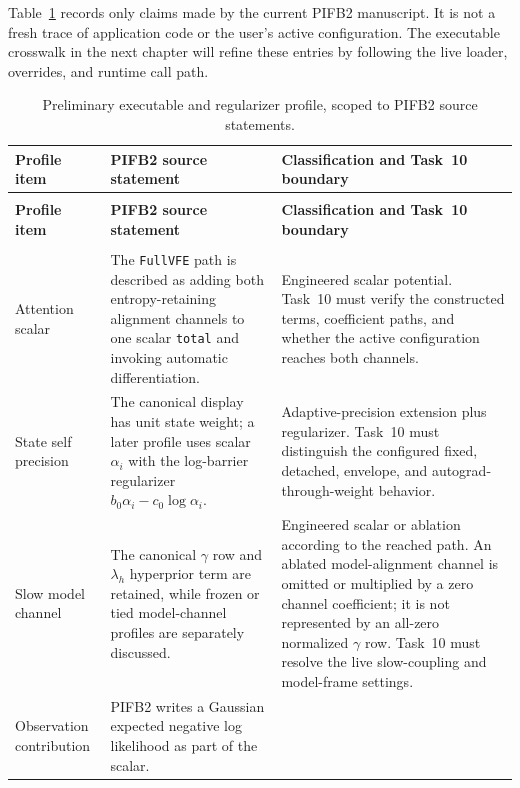 Table~\ref{tab:pifb2-source-scoped-profile} records only claims made by the current PIFB2 manuscript. It is not a fresh trace of application code or the user's active configuration. The executable crosswalk in the next chapter will refine these entries by following the live loader, overrides, and runtime call path.

\small
\begin{longtable}{>{\raggedright\arraybackslash}p{}>{\raggedright\arraybackslash}p{}>{\raggedright\arraybackslash}p{}}
\caption{Preliminary executable and regularizer profile, scoped to PIFB2 source statements.}
\label{tab:pifb2-source-scoped-profile}\\
\toprule
\textbf{Profile item} & \textbf{PIFB2 source statement} & \textbf{Classification and Task~10 boundary} \\
\midrule
\endfirsthead
\multicolumn{3}{l}{\textit{Table \thetable\ continued}}\\
\toprule
\textbf{Profile item} & \textbf{PIFB2 source statement} & \textbf{Classification and Task~10 boundary} \\
\midrule
\endhead
\midrule
\multicolumn{3}{r}{\textit{Continued on next page}}\\
\endfoot
\bottomrule
\endlastfoot
Attention scalar &
The \texttt{FullVFE} path is described as adding both entropy-retaining alignment channels to one scalar \texttt{total} and invoking automatic differentiation. &
Engineered scalar potential. Task~10 must verify the constructed terms, coefficient paths, and whether the active configuration reaches both channels.\\
State self precision &
The canonical display has unit state weight; a later profile uses scalar \(\alpha_i\) with the log-barrier regularizer \(b_0\alpha_i-c_0\log\alpha_i\). &
Adaptive-precision extension plus regularizer. Task~10 must distinguish the configured fixed, detached, envelope, and autograd-through-weight behavior.\\
Slow model channel &
The canonical \(\gamma\) row and \(\lambda_h\) hyperprior term are retained, while frozen or tied model-channel profiles are separately discussed. &
Engineered scalar or ablation according to the reached path. An ablated model-alignment channel is omitted or multiplied by a zero channel coefficient; it is not represented by an all-zero normalized \(\gamma\) row. Task~10 must resolve the live slow-coupling and model-frame settings.\\
Observation contribution &
PIFB2 writes a Gaussian expected negative log likelihood as part of the scalar. &

\end{longtable}
